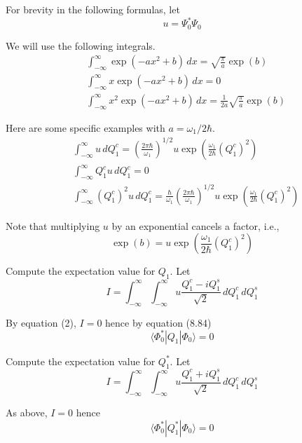 \documentclass[12pt]{article}
\begin{document}
For brevity in the following formulas, let
\begin{equation*}
u=\Psi_0^*\Psi_0
\end{equation*}

We will use the following integrals.
\begin{align*}
&\int_{-\infty}^\infty\exp(-ax^2+b)\,dx=\sqrt{\frac{\pi}{a}}\exp(b)
\tag{1}
\\
&\int_{-\infty}^\infty x\exp(-ax^2+b)\,dx=0
\tag{2}
\\
&\int_{-\infty}^\infty x^2\exp(-ax^2+b)\,dx=\frac{1}{2a}\sqrt{\frac{\pi}{a}}\exp(b)
\tag{3}
\end{align*}

Here are some specific examples with $a=\omega_1/2\hbar$.
\begin{align*}
&\int_{-\infty}^\infty u\,dQ_1^c=\left(\frac{2\pi\hbar}{\omega_1}\right)^{1/2}
u\exp\left(\frac{\omega_1}{2\hbar}(Q_1^c)^2\right)
\tag{4}
\\
&\int_{-\infty}^\infty Q_1^cu\,dQ_1^c=0
\tag{5}
\\
&\int_{-\infty}^\infty (Q_1^c)^2u\,dQ_1^c=\frac{\hbar}{\omega_1}
\left(\frac{2\pi\hbar}{\omega_1}\right)^{1/2}
u\exp\left(\frac{\omega_1}{2\hbar}(Q_1^c)^2\right)
\tag{6}
\end{align*}

Note that multiplying $u$ by an exponential cancels a factor, i.e.,
\begin{equation*}
\exp(b)=u\exp\left(\frac{\omega_1}{2\hbar}(Q_1^c)^2\right)
\end{equation*}

Compute the expectation value for $Q_1$.
Let
\begin{equation*}
I=\int_{-\infty}^\infty\int_{-\infty}^\infty
u\frac{Q_1^c-iQ_1^s}{\sqrt2}
\,dQ_1^c\,dQ_1^s
\end{equation*}

By equation (2), $I=0$ hence by equation (8.84)
\begin{equation*}
\langle\Phi_0^*|Q_1|\Phi_0\rangle=0
\end{equation*}

Compute the expectation value for $Q_1^*$.
Let
\begin{equation*}
I=\int_{-\infty}^\infty\int_{-\infty}^\infty
u\frac{Q_1^c+iQ_1^s}{\sqrt2}
\,dQ_1^c\,dQ_1^s
\end{equation*}

As above, $I=0$ hence
\begin{equation*}
\langle\Phi_0^*|Q_1^*|\Phi_0\rangle=0
\end{equation*}
\end{document}
